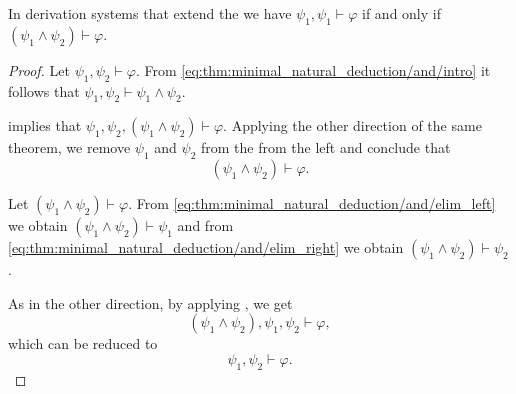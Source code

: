 \begin{proposition}\label{thm:formulas_are_derivable_iff_conjunction_is_derivable}
  In derivation systems that extend the  we have \( \psi_1, \psi_1 \vdash \varphi \) if and only if \( (\psi_1 \wedge \psi_2) \vdash \varphi \).
\end{proposition}
\begin{proof}
  \SufficiencySubProof Let \( \psi_1, \psi_2 \vdash \varphi \). From \eqref{eq:thm:minimal_natural_deduction/and/intro} it follows that \( \psi_1, \psi_2 \vdash \psi_1 \wedge \psi_2 \).

   implies that \( \psi_1, \psi_2, (\psi_1 \wedge \psi_2) \vdash \varphi \). Applying the other direction of the same theorem, we remove \( \psi_1 \) and \( \psi_2 \) from the from the left and conclude that
  \begin{equation*}
    (\psi_1 \wedge \psi_2) \vdash \varphi.
  \end{equation*}

  \NecessitySubProof Let \( (\psi_1 \wedge \psi_2) \vdash \varphi \). From \eqref{eq:thm:minimal_natural_deduction/and/elim_left} we obtain \( (\psi_1 \wedge \psi_2) \vdash \psi_1 \) and from \eqref{eq:thm:minimal_natural_deduction/and/elim_right} we obtain \( (\psi_1 \wedge \psi_2) \vdash \psi_2 \).

  As in the other direction, by applying , we get
  \begin{equation*}
    (\psi_1 \wedge \psi_2), \psi_1, \psi_2 \vdash \varphi,
  \end{equation*}
  which can be reduced to
  \begin{equation*}
    \psi_1, \psi_2 \vdash \varphi.
  \end{equation*}
\end{proof}

